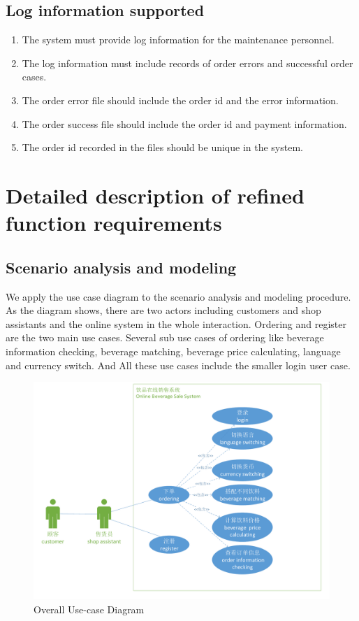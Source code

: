 \documentclass[a4paper]{report}
\begin{document}
\subsection{Log information supported}
\begin{enumerate}
\item The system must provide log information for the maintenance personnel.
\item The log information must include records of order errors and successful order cases.
\item The order error file should include the order id and the error information.
\item The order success file should include the order id and payment information.
\item The order id recorded in the files should be unique in the system.
\end{enumerate}

\section{Detailed description of refined function requirements}

\subsection{Scenario analysis and modeling}
We apply the use case diagram to the scenario analysis and modeling procedure. As the diagram shows, there are two actors including customers and shop assistants and the online  system in the whole interaction. Ordering and register are the  two main use cases. Several sub use cases of ordering like beverage information checking, beverage matching, beverage price calculating, language and currency switch. And All these use cases include the smaller login user case.
\begin{figure}[hbtp]
  \centering
  \includegraphics[scale=0.43]{useCase.pdf}
  \caption{Overall Use-case Diagram}\label{1}
\end{figure}
\end{document}
